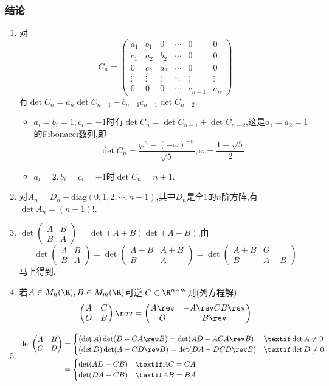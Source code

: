 \documentclass{article}
\newcommand{\matrixtwo}[4]{\begin{pmatrix}#1&#2\\#3&#4 \end{pmatrix}}
\theoremstyle{definition}
\begin{document}
\subsubsection{结论}
\begin{enumerate}
    \item 对$$C_n=\begin{pmatrix}
            a_1&b_1&0&\cdots&0&0\\
            c_1&a_2&b_2&\cdots&0&0\\
            0&c_2&a_3&\cdots&0&0\\
            \vdots&\vdots&\vdots&\ddots&\vdots&\vdots\\
            0&0&0&\cdots&c_{n-1}&a_n
    \end{pmatrix}$$有$\det C_n=a_n \det C_{n-1}-b_{n-1}c_{n-1}\det C_{n-2}$.
    \begin{itemize}
        \item $a_i=b_i=1, c_i=-1$时有$\det C_n=\det C_{n-1}+\det C_{n-2}$,这是$a_1=a_2=1$的Fibonacci数列,即$$\det C_n=\frac{\varphi^n-(-\varphi)^{-n}}{\sqrt{5}}, \varphi=\frac{1+\sqrt{5}}{2}$$
        \item $a_i=2, b_i=c_i=\pm 1$时$\det C_n=n+1$.
    \end{itemize}
    \item 对$A_n=D_n+\mathrm{diag}(0,1,2,\cdots,n-1)$,其中$D_{n}$是全1的$n$阶方阵,有$\det A_n=(n-1)!$.
    \item $\det \matrixtwo{A}{B}{B}{A}=\det (A+B)\det (A-B)$,由$$\det \matrixtwo{A}{B}{B}{A}=\det \matrixtwo{A+B}{A+B}{B}{A}=\det \matrixtwo{A+B}{O}{B}{A-B}$$马上得到.
    \item 若$A\in M_n(\R),B\in M_m(\R)$可逆,$C\in \R^{n\times m}$则(列方程解)$$\matrixtwo{A}{C}{O}{B}\rev=\matrixtwo{A\rev}{-A\rev CB\rev}{O}{B\rev}$$
    \item $$\begin{aligned}
        \det \matrixtwo{A}{B}{C}{D}&=
        \begin{cases}
            (\det A)\det (D-CA\rev B)=\det (AD-ACA\rev B)& \textif \det A\neq 0\\
            (\det D)\det (A-CD\rev B)=\det (DA-DCD\rev B)& \textif \det D\neq 0
        \end{cases}\\ 
    &=\begin{cases}
        \det (AD-CB)& \textif AC=CA\\
        \det (DA-CB)& \textif AB=BA
\end{cases}
\end{aligned}$$

\end{enumerate}
\end{document}
